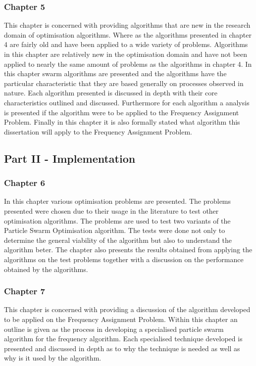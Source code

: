 \subsubsection{Chapter 5}
This chapter is concerned with providing algorithms that are new in the research domain of optimisation algorithms. Where as the algorithms presented in chapter 4 are fairly old and have been applied to a wide variety of problems. Algorithms in this chapter are relatively new in the optimisation domain and have not been applied to nearly the same amount of problems as the algorithms in chapter 4. In this chapter swarm algorithms are presented and the algorithms have the particular characteristic that they are based generally on processes observed in nature. Each algorithm presented is discussed in depth with their core characteristics outlined and discussed. Furthermore for each algorithm a analysis is presented if the algorithm were to be applied to the Frequency Assignment Problem. Finally in this chapter it is also formally stated what algorithm this dissertation will apply to the Frequency Assignment Problem.
\subsection{Part II - Implementation}
\subsubsection{Chapter 6}
In this chapter various optimisation problems are presented. The problems presented were chosen due to their usage in the literature to test other optimisation algorithms. The problems are used to test two variants of the Particle Swarm Optimisation algorithm. The tests were done not only to determine the general viability of the algorithm but also to understand the algorithm beter. The chapter also presents the results obtained from applying the algorithms on the test problems together with a discussion on the performance obtained by the algorithms.
\subsubsection{Chapter 7}
This chapter is concerned with providing a discussion of the algorithm developed to be applied on the Frequency Assignment Problem. Within this chapter an outline is given as the process in developing a specialised particle swarm algorithm for the frequency algorithm. Each specialised technique developed is presented and discussed in depth as to why the technique is needed as well as why is it used by the algorithm.
